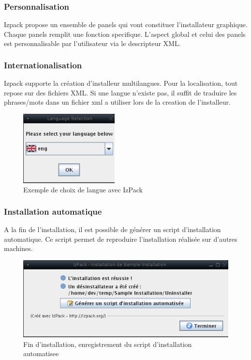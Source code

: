 \subsubsection{Personnalisation}
Izpack propose un ensemble de panels qui vont constituer l'installateur graphique. Chaque panels remplit une fonction specifique. L'aspect global et celui des panels est personnalisable par l'utilisateur via le descripteur XML.

\subsubsection{Internationalisation}
Izpack supporte la création d'installeur multilangues. Pour la localisation, tout repose sur des fichiers XML. Si une langue n'existe pas, il suffit de traduire les phrases/mots dans un fichier xml a utiliser lors de la creation de l'installeur.

\begin{figure}[H]
	\centering
	\includegraphics[width=5cm]{../image/LangChoice.png}
	\caption{Exemple de choix de langue avec IzPack}
\end{figure}

\subsubsection{Installation automatique}
A la fin de l'installation, il est possible de générer un script d'installation automatique. Ce script permet de reproduire l'installation réalisée sur d'autres machines.
\begin{figure}[H]
	\centering
	\includegraphics[width=12cm]{../image/SaveInstallXML.png}
	\caption{Fin d'installation, enregistrement du script d'installation automatisee}
\end{figure}

